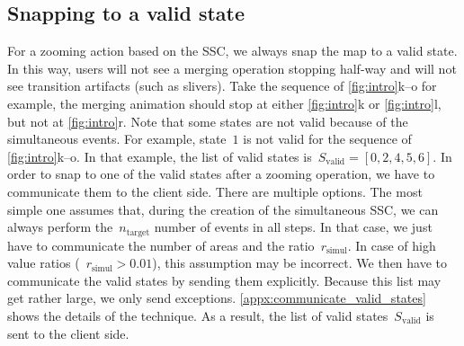 \documentclass[twocolumn]{svjour3}          %
\begin{document}
\subsection{Snapping to a valid state}
\label{sec:snap}

For a zooming action based on the SSC, 
we always snap the map to a valid state.
In this way, users will not see a merging operation stopping half-way
and will not see transition artifacts (such as slivers).
Take the sequence of \fig\ref{fig:intro}k--o for example, 
the merging animation should stop at 
either \ref{fig:intro}k or \ref{fig:intro}l,
but not at \ref{fig:intro}r.
Note that some states are not valid because of the simultaneous events.
For example, state~$1$ is not valid 
for the sequence of \fig\ref{fig:intro}k--o.
In that example, the list of valid states 
is~$S_\mathrm{valid} = [0, 2, 4, 5, 6]$.
In order to snap to one of the valid states after a zooming operation,
we have to communicate them to the client side. 
There are multiple options. 
The most simple one assumes that, 
during the creation of the simultaneous SSC, 
we can always perform the~$n_\mathrm{target}$ number of events in all steps. 
In that case, we just have to communicate 
the number of areas and the ratio~$r_\mathrm{simul}$. 
In case of high value ratios (\eg~$r_\mathrm{simul} > 0.01$), 
this assumption may be incorrect. 
We then have to communicate the valid states by sending them explicitly. 
Because this list may get rather large,
we only send exceptions.
\appx\ref{appx:communicate_valid_states} shows the details of the technique.
As a result, the list of valid states~$S_\mathrm{valid}$ is sent to the client side.
\end{document}
